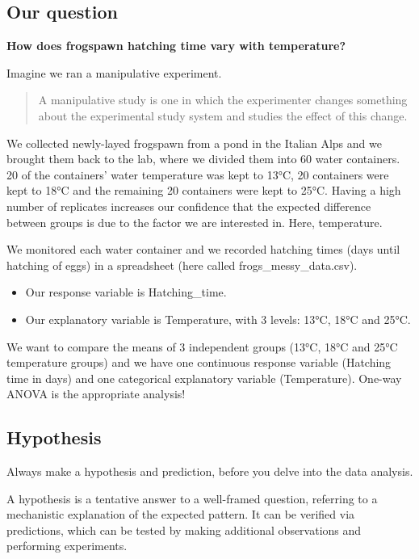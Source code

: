 \documentclass[
]{book}
\begin{document}
\hypertarget{our-question}{%
\subsection{Our question}\label{our-question}}

\textbf{How does frogspawn hatching time vary with temperature?}

Imagine we ran a manipulative experiment.

\begin{quote}
A manipulative study is one in which the experimenter changes something about the experimental study system and studies the effect of this change.
\end{quote}

We collected newly-layed frogspawn from a pond in the Italian Alps and we brought them back to the lab, where we divided them into 60 water containers. 20 of the containers' water temperature was kept to 13°C, 20 containers were kept to 18°C and the remaining 20 containers were kept to 25°C. Having a high number of replicates increases our confidence that the expected difference between groups is due to the factor we are interested in. Here, temperature.

We monitored each water container and we recorded hatching times (days until hatching of eggs) in a spreadsheet (here called frogs\_messy\_data.csv).

\begin{itemize}
\item
  Our response variable is Hatching\_time.
\item
  Our explanatory variable is Temperature, with 3 levels: 13°C, 18°C and 25°C.
\end{itemize}

We want to compare the means of 3 independent groups (13°C, 18°C and 25°C temperature groups) and we have one continuous response variable (Hatching time in days) and one categorical explanatory variable (Temperature). One-way ANOVA is the appropriate analysis!

\hypertarget{hypothesis}{%
\subsection{Hypothesis}\label{hypothesis}}

Always make a hypothesis and prediction, before you delve into the data analysis.

A hypothesis is a tentative answer to a well-framed question, referring to a mechanistic explanation of the expected pattern. It can be verified via predictions, which can be tested by making additional observations and performing experiments.
\end{document}

